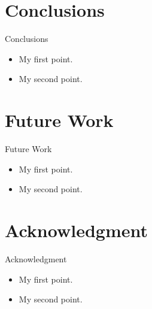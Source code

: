 \documentclass{beamer}
\begin{document}
\section{Conclusions}
\begin{frame}{Conclusions}
  \begin{itemize}
  \item {
    My first point.
  }
  \item {
    My second point.
  }
  \end{itemize}
\end{frame}

\section{Future Work}
\begin{frame}{Future Work}
  \begin{itemize}
  \item {
    My first point.
  }
  \item {
    My second point.
  }
  \end{itemize}
\end{frame}

\section*{Acknowledgment}

\begin{frame}{Acknowledgment}
  \begin{itemize}
  \item {
    My first point.
  }
  \item {
    My second point.
  }
  \end{itemize}
\end{frame}


    

    
 
\end{document}
